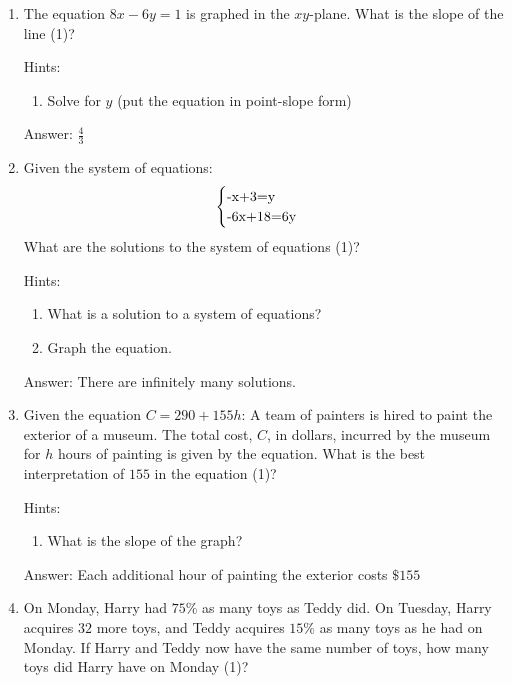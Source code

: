 \documentclass{article}
\begin{document}
\begin{enumerate}
{	      Answer: 0.5}

	\item {The equation $8x-6y=1$ is graphed in the $xy$-plane. What is the slope of the line (1)?

	      Hints:
	      \begin{enumerate}
		      \item{Solve for $y$ (put the equation in point-slope form)}
	      \end{enumerate}

	      Answer: $\frac{4}{3}$}
	\item {Given the system of equations:
	      \[
		      \begin{array}{l}
			      \begin{cases}
				      $-x+3=y$ & \\
				      $-6x+18=6y$
			      \end{cases}
		      \end{array}\]
	      What are the solutions to the system of equations (1)?

	      Hints:
	      \begin{enumerate}
		      \item{What is a solution to a system of equations?}
		      \item {Graph the equation.}
	      \end{enumerate}

	      Answer: There are infinitely many solutions.
	      }

	\item {Given the equation $C = 290+155h$: A team of painters is hired to paint the exterior of a museum. The total cost, $C$, in dollars, incurred by the museum for $h$ hours of painting is given by the equation. What is the best interpretation of $155$ in the equation (1)?

	      Hints:
	      \begin{enumerate}
		      \item {What is the slope of the graph?}
	      \end{enumerate}

	      Answer: Each additional hour of painting the exterior costs $\$155$}

	\item {
	      On Monday, Harry had $75\%$ as many toys as Teddy did. On Tuesday, Harry acquires $32$ more toys, and Teddy acquires $15\%$ as many toys as he had on Monday. If Harry and Teddy now have the same number of toys, how many toys did Harry have on Monday (1)?

}
\end{enumerate}
\end{document}
